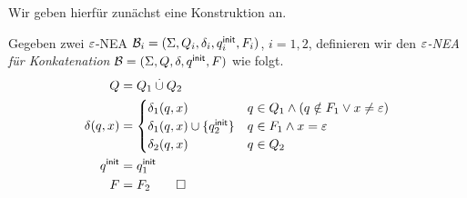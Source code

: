 {Wir geben hierfür zunächst eine Konstruktion an.

\begin{Def}
Gegeben zwei $\varepsilon$-NEA $\mathcal{B}_i= (\Sigma, Q_i,\delta_i,q^\mathsf{init}_i,F_i)$, $i = 1,2$, definieren wir den \emph{$\varepsilon$-NEA für Konkatenation} $\mathcal{B}= (\Sigma, Q,\delta,q^\mathsf{init},F)$ wie folgt.
                \begin{align*}
                Q &= Q_1 \overset.\cup Q_2\\
                \delta(q,x) &=
                                \begin{cases}
                                        \delta_1(q,x) & q\in Q_1\land (q\notin F_1 \lor x\neq \varepsilon)\\
                                        \delta_1(q,x)\cup\{q^\mathsf{init}_2\} & q\in F_1\land x=\varepsilon\\
                                        \delta_2(q,x) & q\in Q_2
                                \end{cases}\\
                q^\mathsf{init} & = q^\mathsf{init}_1\\
                F &= F_2 \qedhere
                \end{align*}
\end{Def}

}
